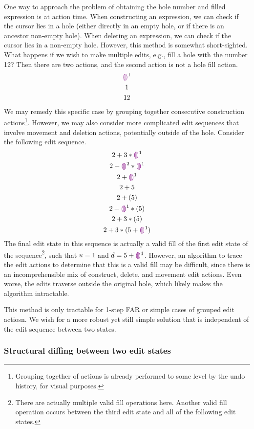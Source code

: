 One way to approach the problem of obtaining the hole number and filled expression is at action time. When constructing an expression, we can check if the cursor lies in a hole (either directly in an empty hole, or if there is an ancestor non-empty hole). When deleting an expression, we can check if the cursor lies in a non-empty hole. However, this method is somewhat short-sighted. What happens if we wish to make multiple edits, e.g., fill a hole with the number 12? Then there are two actions, and the second action is not a hole fill action.
\begin{gather*}
  \textcolor{violet}{\llparenthesis}\textcolor{violet}{\rrparenthesis}^1 \\
  1 \\
  12
\end{gather*}
We may remedy this specific case by grouping together consecutive construction actions\footnote{Grouping together of actions is already performed to some level by the undo history, for visual purposes.}. However, we may also consider more complicated edit sequences that involve movement and deletion actions, potentially outside of the hole. Consider the following edit sequence.
\begin{gather*}
  2+3*\textcolor{violet}{\llparenthesis}\textcolor{violet}{\rrparenthesis}^1 \\
  2+\textcolor{violet}{\llparenthesis}\textcolor{violet}{\rrparenthesis}^2*\textcolor{violet}{\llparenthesis}\textcolor{violet}{\rrparenthesis}^1\\
  2+\textcolor{violet}{\llparenthesis}\textcolor{violet}{\rrparenthesis}^1\\
  2+5 \\
  2+(5) \\
  2+\textcolor{violet}{\llparenthesis}\textcolor{violet}{\rrparenthesis}^1*(5) \\
  2+3*(5) \\
  2+3*(5+\textcolor{violet}{\llparenthesis}\textcolor{violet}{\rrparenthesis}^1)
\end{gather*}
The final edit state in this sequence is actually a valid fill of the first edit state of the sequence\footnote{There are actually multiple valid fill operations here. Another valid fill operation occurs between the third edit state and all of the following edit states.}, such that $u=1$ and $d=5+\textcolor{violet}{\llparenthesis}\textcolor{violet}{\rrparenthesis}^1$. However, an algorithm to trace the edit actions to determine that this is a valid fill may be difficult, since there is an incomprehensible mix of construct, delete, and movement edit actions. Even worse, the edits traverse outside the original hole, which likely makes the algorithm intractable.

This method is only tractable for 1-step FAR or simple cases of grouped edit actiosn. We wish for a more robust yet still simple solution that is independent of the edit sequence between two states.

\subsubsection{Structural diffing between two edit states}
\label{sec:far-detect-structural-diff}

